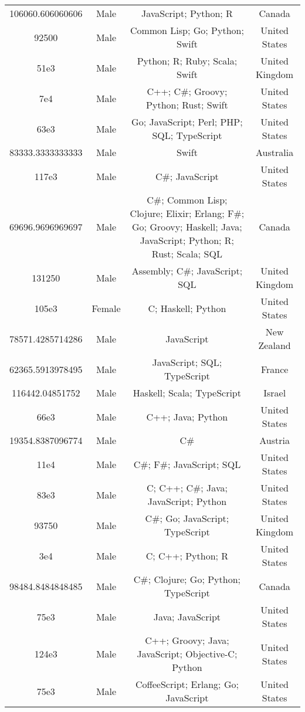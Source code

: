 \begin{center}
\begin{tabular}{ |c|c|c|c| }
106060.606060606  &  Male  &  JavaScript; Python; R  &  Canada  \\ 
92500  &  Male  &  Common Lisp; Go; Python; Swift  &  United States  \\ 
51e3  &  Male  &  Python; R; Ruby; Scala; Swift  &  United Kingdom  \\ 
7e4  &  Male  &  C++; C\#; Groovy; Python; Rust; Swift  &  United States  \\ 
63e3  &  Male  &  Go; JavaScript; Perl; PHP; SQL; TypeScript  &  United States  \\ 
83333.3333333333  &  Male  &  Swift  &  Australia  \\ 
117e3  &  Male  &  C\#; JavaScript  &  United States  \\ 
69696.9696969697  &  Male  &  C\#; Common Lisp; Clojure; Elixir; Erlang; F\#; Go; Groovy; Haskell; Java; JavaScript; Python; R; Rust; Scala; SQL  &  Canada  \\ 
131250  &  Male  &  Assembly; C\#; JavaScript; SQL  &  United Kingdom  \\ 
105e3  &  Female  &  C; Haskell; Python  &  United States  \\ 
78571.4285714286  &  Male  &  JavaScript  &  New Zealand  \\ 
62365.5913978495  &  Male  &  JavaScript; SQL; TypeScript  &  France  \\ 
116442.04851752  &  Male  &  Haskell; Scala; TypeScript  &  Israel  \\ 
66e3  &  Male  &  C++; Java; Python  &  United States  \\ 
19354.8387096774  &  Male  &  C\#  &  Austria  \\ 
11e4  &  Male  &  C\#; F\#; JavaScript; SQL  &  United States  \\ 
83e3  &  Male  &  C; C++; C\#; Java; JavaScript; Python  &  United States  \\ 
93750  &  Male  &  C\#; Go; JavaScript; TypeScript  &  United Kingdom  \\ 
3e4  &  Male  &  C; C++; Python; R  &  United States  \\ 
98484.8484848485  &  Male  &  C\#; Clojure; Go; Python; TypeScript  &  Canada  \\ 
75e3  &  Male  &  Java; JavaScript  &  United States  \\ 
124e3  &  Male  &  C++; Groovy; Java; JavaScript; Objective-C; Python  &  United States  \\ 
75e3  &  Male  &  CoffeeScript; Erlang; Go; JavaScript  &  United States  \\ 

\end{tabular}
\end{center}
